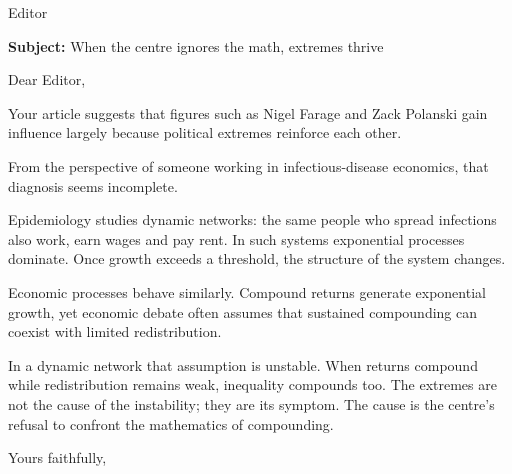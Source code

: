\documentclass{letter}
\begin{document}
\begin{letter}{Editor}
\opening{\textbf{Subject:} When the centre ignores the math, extremes thrive}

\medskip

Dear Editor,

Your article suggests that figures such as Nigel Farage and Zack Polanski gain influence largely because political extremes reinforce each other.

From the perspective of someone working in infectious-disease economics, that diagnosis seems incomplete.

Epidemiology studies dynamic networks: the same people who spread infections also work, earn wages and pay rent. In such systems exponential processes dominate. Once growth exceeds a threshold, the structure of the system changes.

Economic processes behave similarly. Compound returns generate exponential growth, yet economic debate often assumes that sustained compounding can coexist with limited redistribution.

In a dynamic network that assumption is unstable. When returns compound while redistribution remains weak, inequality compounds too. The extremes are not the cause of the instability; they are its symptom. The cause is the centre’s refusal to confront the mathematics of compounding.

\closing{Yours faithfully,}

\end{letter}
\end{document}
